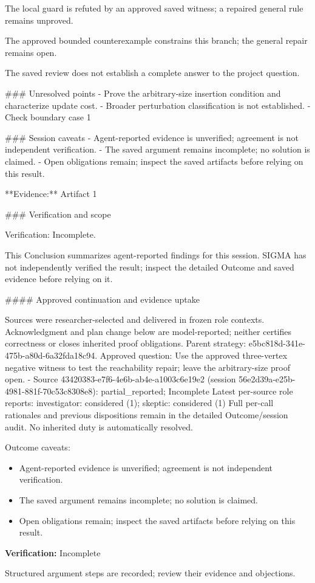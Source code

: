 \documentclass[11pt]{article}
\begin{document}
The local guard is refuted by an approved saved witness; a repaired general rule remains unproved.

The approved bounded counterexample constrains this branch; the general repair remains open.

The saved review does not establish a complete answer to the project question.

\#\#\# Unresolved points
- Prove the arbitrary-size insertion condition and characterize update cost.
- Broader perturbation classification is not established.
- Check boundary case 1

\#\#\# Session caveats
- Agent-reported evidence is unverified; agreement is not independent verification.
- The saved argument remains incomplete; no solution is claimed.
- Open obligations remain; inspect the saved artifacts before relying on this result.

**Evidence:** Artifact 1

\#\#\# Verification and scope

Verification: Incomplete.

This Conclusion summarizes agent-reported findings for this session. SIGMA has not independently verified the result; inspect the detailed Outcome and saved evidence before relying on it.

\#\#\#\# Approved continuation and evidence uptake

Sources were researcher-selected and delivered in frozen role contexts. Acknowledgment and plan change below are model-reported; neither certifies correctness or closes inherited proof obligations.
Parent strategy: e5bc818d-341e-475b-a80d-6a32fda18c94. Approved question: Use the approved three-vertex negative witness to test the reachability repair; leave the arbitrary-size proof open.
- Source 43420383-e7f6-4e6b-ab4e-a1003c6e19e2 (session 56e2d39a-e25b-4981-881f-70c53c8308e8): partial\_reported; Incomplete
Latest per-source role reports: investigator: considered (1); skeptic: considered (1)
Full per-call rationales and previous dispositions remain in the detailed Outcome/session audit. No inherited duty is automatically resolved.\par
Outcome caveats:\par
\begin{itemize}
\item Agent-reported evidence is unverified; agreement is not independent verification.
\item The saved argument remains incomplete; no solution is claimed.
\item Open obligations remain; inspect the saved artifacts before relying on this result.
\end{itemize}
\textbf{Verification:} Incomplete\par
Structured argument steps are recorded; review their evidence and objections.\par
\end{document}
